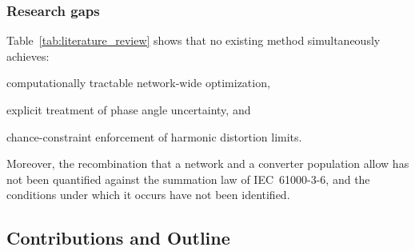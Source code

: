 \subsubsection{Research gaps}

Table~\ref{tab:literature_review} shows that no existing method simultaneously achieves:
\begin{enumerate*}
    \item [(i)] computationally tractable network-wide optimization,
    \item [(ii)] explicit treatment of phase angle uncertainty, and
    \item [(iii)] chance-constraint enforcement of harmonic distortion limits.
\end{enumerate*}
Moreover, the recombination that a network and a converter population allow has not been quantified against the summation law of IEC~61000-3-6, and the conditions under which it occurs have not been identified.

\subsection{Contributions and Outline}
\label{sec:contribution_and_outline}

